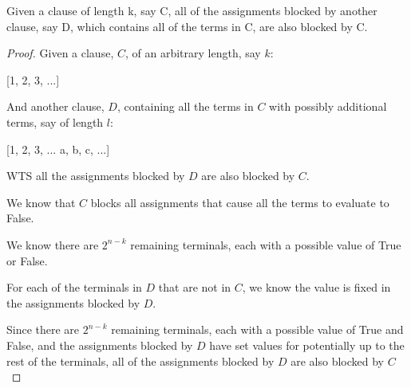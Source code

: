 \documentclass[manuscript]{acmart}
\begin{document}
    \begin{lemma}
        Given a clause of length k, say C, all of the assignments blocked by
        another clause, say D, which contains all of the terms in C, are also blocked
        by C.
    \end{lemma}
    \begin{proof}
        Given a clause, $C$, of an arbitrary length, say $k$:

        [1, 2, 3, ...]

        And another clause, $D$, containing all the terms in $C$ with possibly
        additional terms, say of length $l$:

        [1, 2, 3, ... a, b, c, ...]

        WTS all the assignments blocked by $D$ are also blocked by $C$.

        We know that $C$ blocks all assignments that cause all the terms to evaluate
        to False.

        We know there are $2^{n-k}$ remaining terminals, each with a possible value
        of True or False.

        For each of the terminals in $D$ that are not in $C$, we know the value is fixed
        in the assignments blocked by $D$.

        Since there are $2^{n-k}$ remaining terminals, each with a possible value of True and False,
        and the assignments blocked by $D$ have set values for potentially up to the 
        rest of the terminals, all of the assignments blocked by $D$ are also blocked by $C$        
    \end{proof}
\end{document}
